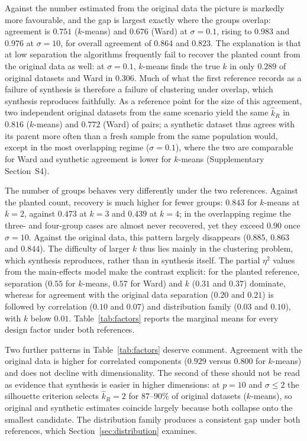 \documentclass[pdflatex,sn-basic]{sn-jnl}
\begin{document}
Against the number estimated from the original data the picture is markedly
more favourable, and the gap is largest exactly where the groups overlap:
agreement is $0.751$ ($k$-means) and $0.676$ (Ward) at $\sigma = 0.1$, rising
to $0.983$ and $0.976$ at $\sigma = 10$, for overall agreement of $0.864$ and
$0.823$. The explanation is that at low separation the algorithms frequently
fail to recover the planted count from the original data as well: at
$\sigma = 0.1$, $k$-means finds the true $k$ in only $0.289$ of original
datasets and Ward in $0.306$. Much of what the first reference records as a
failure of synthesis is therefore a failure of clustering under overlap, which
synthesis reproduces faithfully. As a reference point for the size of this
agreement, two independent original datasets from the same scenario yield the
same $\hat{k}_R$ in $0.816$ ($k$-means) and $0.772$ (Ward) of pairs; a
synthetic dataset thus agrees with its parent more often than a fresh sample
from the same population would, except in the most overlapping regime
($\sigma = 0.1$), where the two are comparable for Ward and synthetic agreement
is lower for $k$-means (Supplementary Section~S4).

The number of groups behaves very differently under the two references.
Against the planted count, recovery is much higher for fewer groups: $0.843$
for $k$-means at $k = 2$, against $0.473$ at $k = 3$ and $0.439$ at $k = 4$;
in the overlapping regime the three- and four-group cases are almost never
recovered, yet they exceed $0.90$ once $\sigma = 10$. Against the original
data, this pattern largely disappears ($0.885$, $0.863$ and $0.844$). The
difficulty of larger $k$ thus lies mainly in the clustering problem, which
synthesis reproduces, rather than in synthesis itself. The partial $\eta^2$
values from the main-effects model make the contrast explicit: for the planted
reference, separation ($0.55$ for $k$-means, $0.57$ for Ward) and $k$ ($0.31$
and $0.37$) dominate, whereas for agreement with the original data separation
($0.20$ and $0.21$) is followed by correlation ($0.10$ and $0.07$) and
distribution family ($0.03$ and $0.10$), with $k$ below $0.01$.
Table~\ref{tab:factors} reports the marginal means for every design factor
under both references.

Two further patterns in Table~\ref{tab:factors} deserve comment. Agreement
with the original data is higher for correlated components ($0.929$ versus
$0.800$ for $k$-means) and does not decline with dimensionality. The second of
these should not be read as evidence that synthesis is easier in higher
dimensions: at $p = 10$ and $\sigma \le 2$ the silhouette criterion selects
$\hat{k}_R = 2$ for $87$--$90\%$ of original datasets ($k$-means), so original
and synthetic estimates coincide largely because both collapse onto the
smallest candidate. The distribution family produces a consistent gap under
both references, which Section~\ref{sec:distribution} examines.
\end{document}
